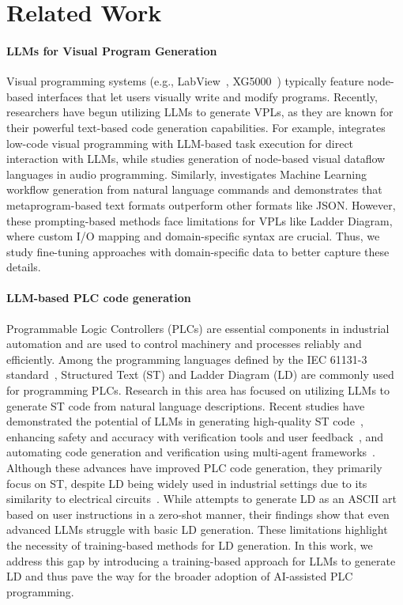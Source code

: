 \section{Related Work}
\paragraph{LLMs for Visual Program Generation}
Visual programming systems (e.g., LabView~\cite{bitter2006labview}, XG5000~\cite{XG5000Manual}) typically feature node-based interfaces that let users visually write and modify programs. Recently, researchers have begun utilizing LLMs to generate VPLs, as they are known for their powerful text-based code generation capabilities. For example, \citet{cai-etal-2024-low-code} integrates low-code visual programming with LLM-based task execution for direct interaction with LLMs, while \citet{zhang2024benchmarking} studies generation of node-based visual dataflow languages in audio programming. Similarly, \citet{xue2024comfybenchbenchmarkingllmbasedagents,52868} investigates Machine Learning workflow generation from natural language commands and demonstrates that metaprogram-based text formats outperform other formats like JSON. However, these prompting-based methods face limitations for VPLs like Ladder Diagram, where custom I/O mapping and domain-specific syntax are crucial. Thus, we study fine-tuning approaches with domain-specific data to better capture these details.

\paragraph{LLM-based PLC code generation}
Programmable Logic Controllers (PLCs) are essential components in industrial automation and are used to control machinery and processes reliably and efficiently. Among the programming languages defined by the IEC 61131-3 standard~\cite{IEC61131-3}, Structured Text (ST) and Ladder Diagram (LD) are commonly used for programming PLCs. Research in this area has focused on utilizing LLMs to generate ST code from natural language descriptions. Recent studies have demonstrated the potential of LLMs in generating high-quality ST code~\cite{koziolek2023chatgpt, koziolek2024llm}, enhancing safety and accuracy with verification tools and user feedback~\cite{fakih2024llm4plc}, and automating code generation and verification using multi-agent frameworks~\cite{liu2024agents4plc}. Although these advances have improved PLC code generation, they primarily focus on ST, despite LD being widely used in industrial settings due to its similarity to electrical circuits~\cite{ladderlogic}. While \citet{Zhang_2024} attempts to generate LD as an ASCII art based on user instructions in a zero-shot manner, their findings show that even advanced LLMs struggle with basic LD generation. These limitations highlight the necessity of training-based methods for LD generation. In this work, we address this gap by introducing a training-based approach for LLMs to generate LD and thus pave the way for the broader adoption of AI-assisted PLC programming.